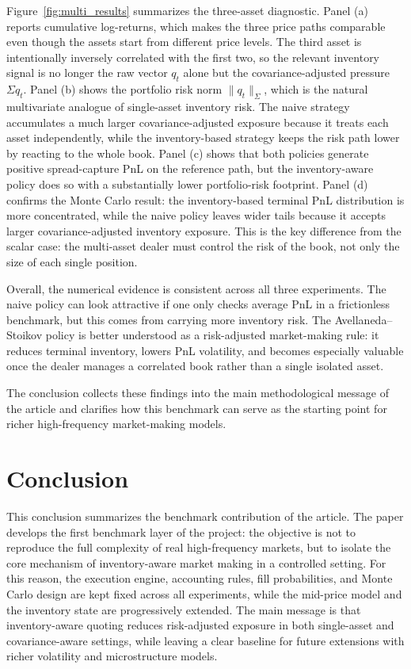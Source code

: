 \documentclass[a4paper,10pt,titlepage,oneside,openany]{book}
\theoremstyle{plain}\newtheorem{theorem}{Theorem}[chapter]
\theoremstyle{definition}\newtheorem{definition}{Definition}[chapter]
\theoremstyle{remark}\newtheorem{remark}{Remark}[chapter]
\begin{document}
Figure~\ref{fig:multi_results} summarizes the three-asset diagnostic. Panel (a) reports cumulative log-returns, which makes the three price paths comparable even though the assets start from different price levels. The third asset is intentionally inversely correlated with the first two, so the relevant inventory signal is no longer the raw vector $q_t$ alone but the covariance-adjusted pressure $\Sigma q_t$. Panel (b) shows the portfolio risk norm $\|q_t\|_\Sigma$, which is the natural multivariate analogue of single-asset inventory risk. The naive strategy accumulates a much larger covariance-adjusted exposure because it treats each asset independently, while the inventory-based strategy keeps the risk path lower by reacting to the whole book. Panel (c) shows that both policies generate positive spread-capture PnL on the reference path, but the inventory-aware policy does so with a substantially lower portfolio-risk footprint. Panel (d) confirms the Monte Carlo result: the inventory-based terminal PnL distribution is more concentrated, while the naive policy leaves wider tails because it accepts larger covariance-adjusted inventory exposure. This is the key difference from the scalar case: the multi-asset dealer must control the risk of the book, not only the size of each single position.

Overall, the numerical evidence is consistent across all three experiments. The naive policy can look attractive if one only checks average PnL in a frictionless benchmark, but this comes from carrying more inventory risk. The Avellaneda--Stoikov policy is better understood as a risk-adjusted market-making rule: it reduces terminal inventory, lowers PnL volatility, and becomes especially valuable once the dealer manages a correlated book rather than a single isolated asset.

The conclusion collects these findings into the main methodological message of the article and clarifies how this benchmark can serve as the starting point for richer high-frequency market-making models.

\chapter*{Conclusion}

This conclusion summarizes the benchmark contribution of the article. The paper develops the first benchmark layer of the project: the objective is not to reproduce the full complexity of real high-frequency markets, but to isolate the core mechanism of inventory-aware market making in a controlled setting. For this reason, the execution engine, accounting rules, fill probabilities, and Monte Carlo design are kept fixed across all experiments, while the mid-price model and the inventory state are progressively extended. The main message is that inventory-aware quoting reduces risk-adjusted exposure in both single-asset and covariance-aware settings, while leaving a clear baseline for future extensions with richer volatility and microstructure models.
\end{document}
